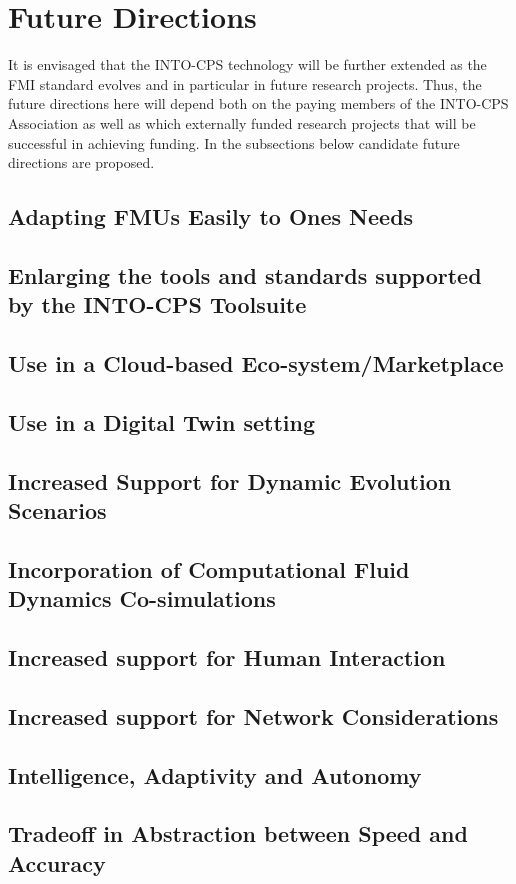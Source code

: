 %
%
%
\section{Future Directions}\label{sec:future}


It is envisaged that the INTO-CPS technology will be further extended as the FMI standard evolves and in particular in future research projects. Thus, the future directions here will depend both on the paying members of the INTO-CPS Association as well as which externally funded research projects that will be successful in achieving funding. In the subsections below candidate future directions are proposed.

\subsection{Adapting FMUs Easily to Ones Needs}

\subsection{Enlarging the tools and standards supported by the INTO-CPS Toolsuite}

\subsection{Use in a Cloud-based Eco-system/Marketplace}

\subsection{Use in a Digital Twin setting}

\subsection{Increased Support for Dynamic Evolution Scenarios}

\subsection{Incorporation of Computational Fluid Dynamics Co-simulations}

\subsection{Increased support for Human Interaction}

\subsection{Increased support for Network Considerations}

\subsection{Intelligence, Adaptivity and Autonomy}

\subsection{Tradeoff in Abstraction between Speed and Accuracy}

